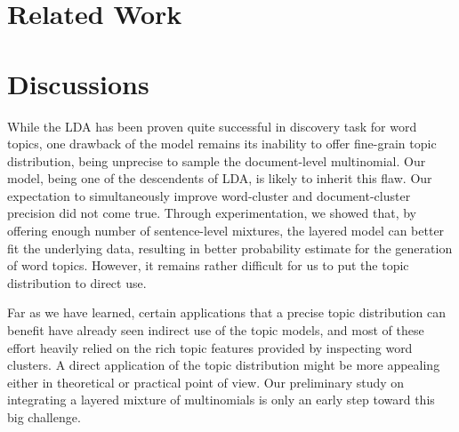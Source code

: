 \section{Related Work} \label{s:related-work} 

\section{Discussions} \label{s:discussions} 
While the LDA has been proven quite successful in discovery task for word
topics, one drawback of the model remains its inability to offer fine-grain
topic distribution, being unprecise to sample the document-level multinomial.
Our model, being one of the descendents of LDA, is likely to inherit this flaw.
Our expectation to simultaneously improve word-cluster and document-cluster
precision did not come true.  Through experimentation, we showed that, by
offering enough number of sentence-level mixtures, the layered model can better
fit the underlying data, resulting in better probability estimate for the
generation of word topics.  However, it remains rather difficult for us to put
the topic distribution to direct use.  

Far as we have learned, certain applications that a precise topic distribution
can benefit have already seen indirect use of the topic models, and most of
these effort heavily relied on the rich topic features provided by inspecting
word clusters.  A direct application of the topic distribution might be more
appealing either in theoretical or practical point of view.  Our preliminary
study on integrating a layered mixture of multinomials is only an early step
toward this big challenge.

\newpage
